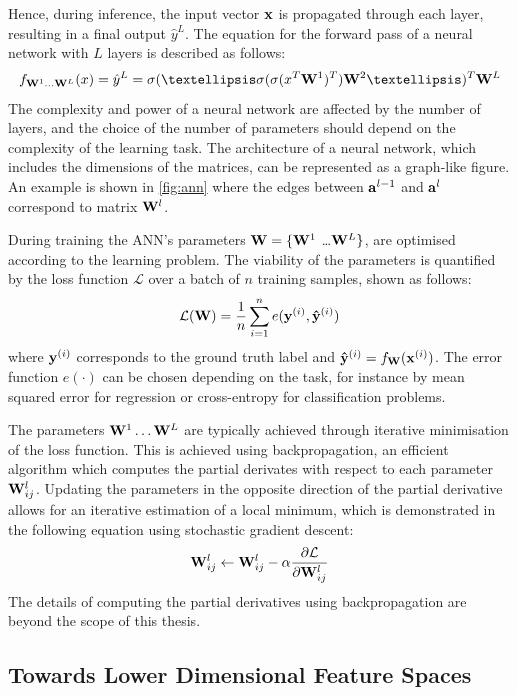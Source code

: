 		Hence, during inference, the input vector $\mathbf{x}$ is propagated through each layer, resulting in a final output $\hat{y}^L$. The equation for the forward pass of a neural network with $L$ layers is described as follows: 	
		$$
			f_{\W^1 \dots \W^L}(x) = \hat{y}^L = \sigma(… \sigma( \sigma( x^T \W^1 )^T) \W^2 …)^T \W^L \label{eq:forward_pass}
		$$
		The complexity and power of a neural network are affected by the number of layers, and the choice of the number of parameters should depend on the complexity of the learning task. The architecture of a neural network, which includes the dimensions of the matrices, can be represented as a graph-like figure. An example is shown in \ref{fig:ann} where the edges between $\mathbf{a}^{l-1}$ and $\mathbf{a}^{l}$ correspond to matrix $\mathbf{W}^l$.

		

	
		During training the ANN's parameters $\mathbf{W} = \{\mathbf{W}^1$ \dots $\mathbf{W}^L\}$, are optimised according to the learning problem. The viability of the parameters is quantified by the loss function $\mathcal{L}$ over a batch of $n$ training samples, shown as follows:
		$$
			\mathcal{L}(\mathbf{W}) = \frac{1}{n}\sum_{i=1}^n e(\mathbf{y}^{(i)}, \mathbf{\hat{y}}^{(i)}) \label{eq:generic_loss}
		$$
		where $\mathbf{y}^{(i)}$ corresponds to the ground truth label and $\mathbf{\hat{y}}^{(i)} = f_{\mathbf{W}}(\mathbf{x}^{(i)})$. The error function $e(\cdot)$ can be chosen depending on the task, for instance by mean squared error for regression or cross-entropy for classification problems.
		
		The parameters $\mathbf{W}^1 \dots \mathbf{W}^L$ are typically achieved through iterative minimisation of the loss function. This is achieved using backpropagation, an efficient algorithm which computes the partial derivates with respect to each parameter $\mathbf{W}^l_{ij}$. Updating the parameters in the opposite direction of the partial derivative allows for an iterative estimation of a local minimum, which is demonstrated in the following equation using stochastic gradient descent:
		$$
			\mathbf{W}^l_{ij} \leftarrow \mathbf{W}^l_{ij} - \alpha \frac{\partial \mathcal{L}}{\partial \mathbf{W}^l_{ij}}
		$$
		The details of computing the partial derivatives using backpropagation are beyond the scope of this thesis.

	
	\subsection{Towards Lower Dimensional Feature Spaces}
	
